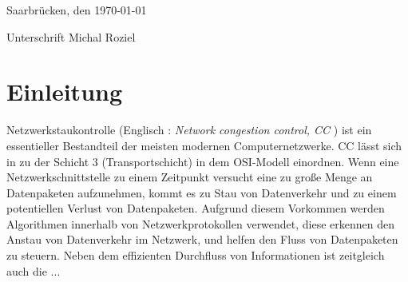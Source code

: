 \documentclass[paper=a4,fontsize=12pt,ngerman]{scrartcl}
\begin{document}
Saarbrücken, den \today

\smallskip
Unterschrift  Michal Roziel




\clearpage
\tableofcontents 

\clearpage
{}



\section{Einleitung}

Netzwerkstaukontrolle (Englisch : \textit{ Network congestion control, CC }) ist ein essentieller Bestandteil der 
meisten modernen Computernetzwerke. CC lässt sich in zu der Schicht 3 (Transportschicht) in dem OSI-Modell einordnen. 
Wenn eine Netzwerkschnittstelle zu einem Zeitpunkt versucht eine zu große Menge an Datenpaketen aufzunehmen,
kommt es zu Stau von Datenverkehr und zu einem potentiellen Verlust von Datenpaketen.
Aufgrund diesem Vorkommen werden Algorithmen innerhalb von Netzwerkprotokollen verwendet, diese erkennen den Anstau von Datenverkehr im Netzwerk,
und helfen den Fluss von Datenpaketen zu steuern. Neben dem effizienten Durchfluss von Informationen ist zeitgleich auch die ...
\end{document}
